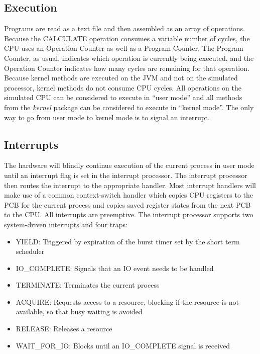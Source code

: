 \documentclass[paper=a4, fontsize=11pt]{scrartcl} %
\numberwithin{equation}{section} %
\numberwithin{figure}{section} %
\numberwithin{table}{section} %
\begin{document}
\subsection{Execution}
Programs are read as a text file and then assembled as an array of operations. Because the CALCULATE operation consumes a variable number of cycles, the CPU uses an Operation Counter as well as a Program Counter. The Program Counter, as usual, indicates which operation is currently being executed, and the Operation Counter indicates how many cycles are remaining for that operation.
Because kernel methods are executed on the JVM and not on the simulated processor, kernel methods do not consume CPU cycles. All operations on the simulated CPU can be considered to execute in ``user mode'' and all methods from the \textit{kernel} package can be considered to execute in ``kernel mode''. The only way to go from user mode to kernel mode is to signal an interrupt.

\subsection{Interrupts}

The hardware will blindly continue execution of the current process in user mode until an interrupt flag is set in the interrupt processor. The interrupt processor then routes the interrupt to the appropriate handler. Most interrupt handlers will make use of a common context-switch handler which copies CPU registers to the PCB for the current process and copies saved register states from the next PCB to the CPU. All interrupts are preemptive. The interrupt processor supports two system-driven interrupts and four traps:


\begin{itemize}
	\item YIELD: Triggered by expiration of the burst timer set by the short term scheduler
          \item IO\_COMPLETE: Signals that an IO event needs to be handled
           \item TERMINATE: Terminates the current process
	\item ACQUIRE: Requests access to a resource, blocking if the resource is not available, so that busy waiting is avoided
	\item RELEASE: Releases a resource
	\item WAIT\_FOR\_IO: Blocks until an IO\_COMPLETE signal is received
\end{itemize}
\end{document}
